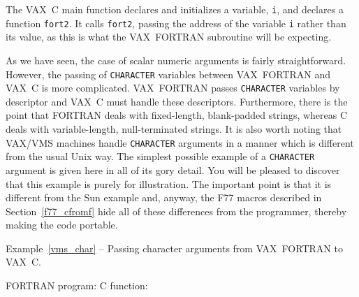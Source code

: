 \documentclass[twoside,11pt]{article}
\newcommand{\htmlref}[2]{#1}
\newcommand{\latex}[1]{#1}
\renewcommand{\_}{\texttt{\symbol{95}}}
\newcounter{examples}
\begin{document}
The VAX~C main function declares and initializes a variable, \texttt{i}, and 
declares a function \texttt{fort2}. 
It calls \texttt{fort2}, passing the address of the variable \texttt{i} rather 
than its value, as this is what the VAX~FORTRAN subroutine will be expecting.

As we have seen, the case of scalar numeric arguments is fairly
straightforward. 
However, the passing of \texttt{CHARACTER} variables between VAX~FORTRAN
and VAX~C is more complicated. VAX~FORTRAN passes \texttt{CHARACTER} variables 
by descriptor and VAX~C must handle these descriptors.
Furthermore, there is the point that FORTRAN deals with fixed-length, 
blank-padded strings, whereas C deals with variable-length, null-terminated
strings. It is also worth noting that VAX/VMS machines handle
\texttt{CHARACTER} arguments in a manner which is different from the usual Unix
way. 
The simplest possible example of a \texttt{CHARACTER} argument is given here 
in all of its gory detail. 
You will be pleased to discover that this example is purely for illustration. 
The important point is that it is different from the Sun example and, anyway,
the 
\htmlref{F77 macros}{f77_cfromf}
\latex{described in Section~\ref{f77_cfromf}} hide all of these
differences from the programmer, thereby making the code portable.

\label{vms_char}
\begin{center}
Example\latex{~\ref{vms_char}}
-- Passing character arguments from VAX~FORTRAN to 
VAX~C\@.
\end{center}
\nopagebreak[4]
FORTRAN program:
\pagebreak[1]
C function:
\end{document}
